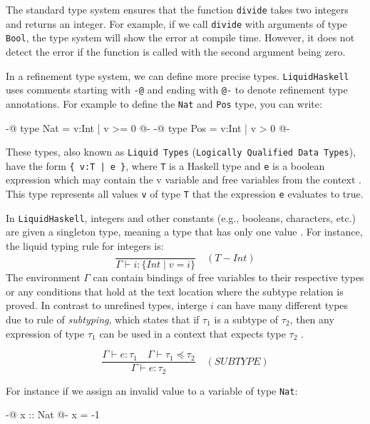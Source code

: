 The standard type system ensures that the function \texttt{divide} takes two integers and
returns an integer. For example, if we call \texttt{divide} with arguments of type
\texttt{Bool}, the type system will show the error at compile time.
However, it does not detect the error if the function is called with the second
argument being zero.

In a refinement type system, we can define more precise types.
\texttt{LiquidHaskell} uses comments starting with \texttt{-@} and ending with \texttt{@-} to denote refinement type annotations.
For example to define the \texttt{Nat} and \texttt{Pos} type, you can write:

\begin{code}
	{-@ type Nat = {v:Int | v >= 0} @-}
	{-@ type Pos = {v:Int | v > 0} @-}
\end{code}

These types, also known as \texttt{Liquid Types} (\texttt{Logically Qualified Data Types}),
have the form \texttt{\{ v:T | e \}}, where \texttt{T} is a Haskell type and \texttt{e} is a boolean expression
which may contain the v variable and free variables from the context \cite{vazou2014}. This type represents all
values \texttt{v} of type \texttt{T} that the expression \texttt{e} evaluates to true.

In \texttt{LiquidHaskell}, integers and other constants (e.g., booleans, characters, etc.) are given a
singleton type, meaning a type that has only one value \cite{niki_lecture_2024}. For instance, the liquid typing rule for integers is:
\[
	\frac{
	}{
		\Gamma \vdash i: \{Int \mid v = i\}
	}
	\quad (\mathit{T-Int})
\]
The environment $\Gamma$ can contain bindings of free variables to their respective types or any conditions that hold at
the text location where the subtype relation is proved.
In contrast to unrefined types, interge $i$ can have many different types due to rule of \textit{subtyping},
which states that if $\tau_1$ is a subtype of $\tau_2$, then any expression of type $\tau_1$ can be used in a context that expects type $\tau_2$ \cite{vazou2014}.

\[
	\frac{
		\Gamma \vdash e: \tau_1  \quad \Gamma \vdash \tau_1 \preceq \tau_2
	}{
		\Gamma \vdash e: \tau_2
	}
	\quad (\mathit{SUBTYPE})
\]

For instance if we assign an invalid value to a variable of type \texttt{Nat}:
\begin{code}
	{-@ x :: Nat @-}
	x = -1
\end{code}


